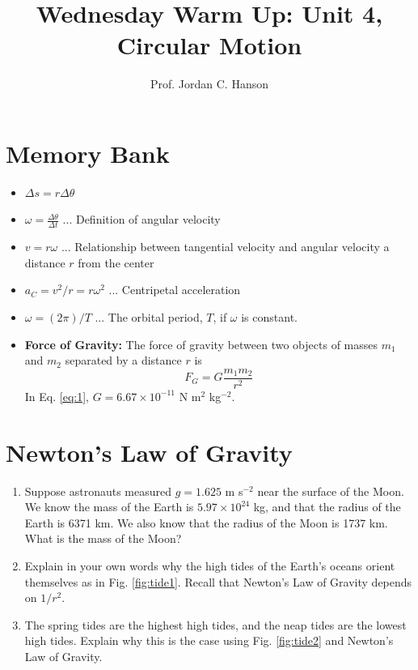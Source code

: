 \documentclass{article}
\begin{document}
\twocolumn

\title{Wednesday Warm Up: Unit 4, Circular Motion}
\author{Prof. Jordan C. Hanson}

\maketitle

\section{Memory Bank}

\begin{itemize}
\item $\Delta s = r \Delta \theta$
\item $\omega = \frac{\Delta \theta}{\Delta t}$ ... Definition of angular velocity
\item $v = r\omega $ ... Relationship between tangential velocity and angular velocity a distance $r$ from the center
\item $a_C = v^2/r = r \omega^2$ ... Centripetal acceleration\
\item $\omega = (2\pi)/T$ ... The orbital period, $T$, if $\omega$ is constant.
\item \textbf{Force of Gravity:} The force of gravity between two objects of masses $m_1$ and $m_2$ separated by a distance $r$ is
\begin{equation}
F_G = G \frac{m_1 m_2}{r^2} \label{eq:1}
\end{equation}
In Eq. \ref{eq:1}, $G = 6.67 \times 10^{-11}$ N m$^{2}$ kg$^{-2}$.
\end{itemize}

\section{Newton's Law of Gravity}

\begin{enumerate}
\item Suppose astronauts measured $g=1.625$ m s$^{-2}$ near the surface of the Moon.  We know the mass of the Earth is $5.97 \times 10^{24}$ kg, and that the radius of the Earth is 6371 km.  We also know that the radius of the Moon is 1737 km.  What is the mass of the Moon? \\ \vspace{6cm}
\item
Explain in your own words why the high tides of the Earth's oceans orient themselves as in Fig. \ref{fig:tide1}.  Recall that Newton's Law of Gravity depends on $1/r^2$.  \\ \vspace{2cm}
\item The spring tides are the highest high tides, and the neap tides are the lowest high tides.  Explain why this is the case using Fig. \ref{fig:tide2} and Newton's Law of Gravity.
\end{enumerate}
\end{document}
